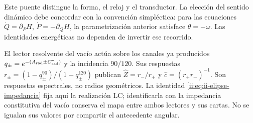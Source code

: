 Este puente distingue la forma, el reloj y el transductor. La elección
del sentido dinámico debe concordar con la convención simpléctica: para
las ecuaciones \(\dot Q=\partial_PH\),
\(\dot P=-\partial_QH\), la parametrización anterior satisface
\(\dot\theta=-\omega\). Las identidades energéticas no dependen
de invertir ese recorrido.

El lector resolvente del vacío actúa sobre los canales ya producidos
\(q_\pm=e^{-(A_{\rm rad}\pm C^*_{\rm rad})}\) y la incidencia
\(90/120\). Sus respuestas
\(r_\pm=(1-q_\pm^{90})/(1-q_\pm^{120})\) publican
\(\widehat Z=r_-/r_+\) y \(\widehat c=(r_+r_-)^{-1}\).
Son respuestas espectrales, no radios geométricos. La identidad
\eqref{ii:eq:ii-elipse-impedancia} fija aquí la realización LC;
identificarla con la impedancia constitutiva del vacío conserva el mapa
entre ambos lectores y sus cartas. No se igualan sus valores por compartir
el antecedente angular.
